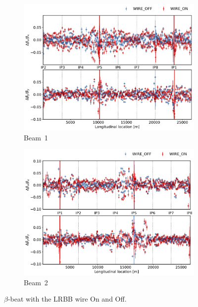 \documentclass{cernatsnote}
\begin{document}
\begin{figure}[ht]
\begin{subfigure}{.5\textwidth}
  \centering
  \includegraphics[width=.8\linewidth]{wire/beam1_beta_beat.pdf}  
  \caption{Beam~1}
\end{subfigure}
\begin{subfigure}{.5\textwidth}
  \centering
  \includegraphics[width=.8\linewidth]{wire/beam2_beta_beat.pdf}  
  \caption{Beam~2}
\end{subfigure}
\caption{$\beta$-beat with the LRBB wire On and Off.}
\label{fig:before_after_pre_cycle}
\end{figure}
\end{document}
